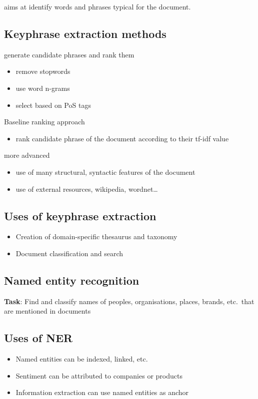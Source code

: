 aims at identify words and phrases typical for the document.

\subsection{Keyphrase extraction methods}
generate candidate phrases and rank them
\begin{itemize}
\item remove stopwords
\item use word n-grams
\item select based on PoS tags
\end{itemize}

Baseline ranking approach
\begin{itemize}
\item rank candidate phrase of the document according to their tf-idf
  value
\end{itemize}
more advanced
\begin{itemize}
\item use of many structural, syntactic features of the document
\item use of external resources, wikipedia, wordnet\ldots
\end{itemize}

\subsection{Uses of keyphrase extraction}
\begin{itemize}
\item Creation of domain-specific thesaurus and taxonomy
\item Document classification and search
\end{itemize}

\subsection{Named entity recognition}
\textbf{Task}: Find and classify names of peoples, organisations,
places, brands, etc.\ that are mentioned in documents

\subsection{Uses of NER}
\begin{itemize}
\item Named entities can be indexed, linked, etc.\
\item Sentiment can be attributed to companies or products
\item Information extraction can use named entities as anchor
\end{itemize}

